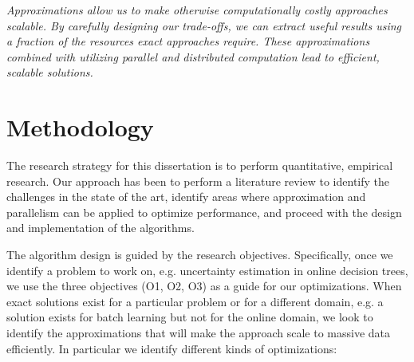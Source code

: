 \begin{displayquote}
	\emph{Approximations allow us to make otherwise computationally costly approaches scalable.
	By carefully designing our trade-offs, we can extract useful results using a fraction
	of the resources exact approaches require. These approximations combined with utilizing parallel and distributed computation lead to efficient, scalable solutions.}
\end{displayquote}

\section{Methodology}

The research strategy for this dissertation is to perform quantitative, empirical research.
Our approach has been to perform a literature review to identify the challenges in the
state of the art, identify areas where approximation and parallelism can be applied to
optimize performance, and proceed with the design and implementation of the algorithms.

The algorithm design is guided by the research objectives. Specifically, once we identify a problem
to work on, e.g. uncertainty estimation in online decision trees, we use the three objectives
(O1, O2, O3) as a guide for our optimizations. When exact solutions exist for a particular problem
or for a different domain, e.g. a solution exists for batch learning but not for the online
domain, we look to identify the approximations that will make the approach scale to massive
data efficiently. In particular we identify different kinds of optimizations:

